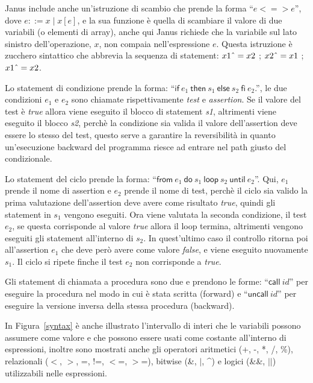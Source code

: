 \documentclass{article}
\theoremstyle{plain}
\theoremstyle{definition}
\theoremstyle{plain}
\newcommand{\ms}[1]{\mathsf{#1}}
\begin{document}
Janus include anche un'istruzione di scambio che prende la forma ``$e <=> e$'', dove $e ::= x \mid x[e]$, e la sua funzione è quella di scambiare il valore di due variabili (o elementi di array), anche qui Janus richiede che la variabile sul lato sinistro dell'operazione, $x$, non compaia nell'espressione $e$. Questa istruzione è zucchero sintattico che abbrevia la sequenza di statement: $x1 \mathbin{\text{\^{}}}= x2$ ; $x2 \mathbin{\text{\^{}}}= x1$ ; $x1 \mathbin{\text{\^{}}}= x2$.

Lo statement di condizione prende la forma: ``$\ms{if}~e_1~\ms{then}~s_1~\ms{else}~s_2~\ms{fi}~e_2$.'', le due condizioni $e_1$ e $e_2$ sono chiamate rispettivamente \emph{test} e \emph{assertion}. Se il valore del test è \emph{true} allora viene eseguito il blocco di statement \emph{s1}, altrimenti viene eseguito il blocco \emph{s2}, perchè la condizione sia valida il valore dell'assertion deve essere lo stesso del test, questo serve a garantire la reversibilità in quanto un'esecuzione backward del programma riesce ad entrare nel path giusto del condizionale.

Lo statement del ciclo prende la forma: ``$\ms{from}~e_1~\ms{do}~s_1~\ms{loop}~s_2~\ms{until}~e_2$''. Qui, $e_1$ prende il nome di assertion e $e_2$ prende il nome di test, perchè il ciclo sia valido la prima valutazione dell'assertion deve avere come risultato \emph{true}, quindi gli statement in $s_1$ vengono eseguiti. Ora viene valutata la seconda condizione, il test $e_2$, se questa corrisponde al valore \emph{true} allora il loop termina, altrimenti vengono eseguiti gli statement all'interno di $s_2$. In quest'ultimo caso il controllo ritorna poi all'assertion $e_1$ che deve però avere come valore \emph{false}, e viene eseguito nuovamente $s_1$. Il ciclo si ripete finche il test $e_2$ non corrisponde a \emph{true}.

Gli statement di chiamata a procedura sono due e prendono le forme: ``$\ms{call}~\mathit{id}$'' per eseguire la procedura nel modo in cui è stata scritta (forward) e ``$\ms{uncall}~\mathit{id}$'' per eseguire la versione inversa della stessa procedura (backward).

In Figura~\ref{syntax} è anche illustrato l'intervallo di interi che le variabili possono assumere come valore e che possono essere usati come costante all'interno di espressioni, inoltre sono mostrati anche gli operatori aritmetici (+, -, *, /, \%), relazionali ($<$, $>$, =, !=, $<$=, $>$=), bitwise (\&, $|$, \textasciicircum{}) e logici (\&\&, $|$$|$) utilizzabili nelle espressioni.
\bigskip
\end{document}
